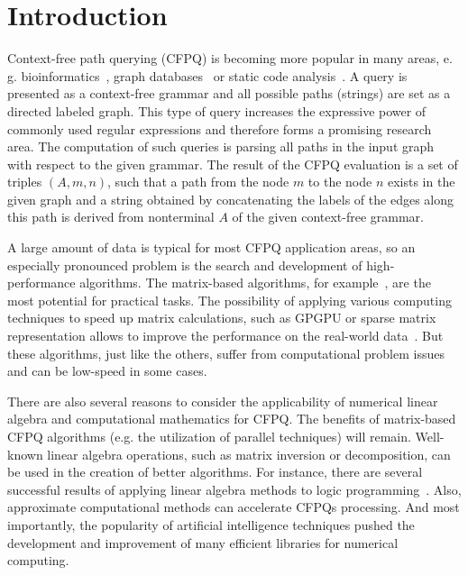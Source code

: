 \documentclass[sigconf]{acmart}
\begin{document}



\maketitle

\section{Introduction}

Context-free path querying (CFPQ) is becoming more popular in many areas, e. g. bioinformatics~\cite{Bio}, graph databases~\cite{graphDB} or static code analysis~\cite{zhang2013fast}. 
A query is presented as a context-free grammar and all possible paths (strings) are set as a directed labeled graph. 
This type of query increases the expressive power of commonly used regular expressions and therefore forms a promising research area.
The computation of such queries is parsing all paths in the input graph with respect to the given grammar. 
The result of the CFPQ evaluation is a set of triples $(A, m, n)$, such that a path from the node $m$ to the node $n$ exists in the given graph and a string obtained by concatenating the labels of the edges along this path is derived from nonterminal $A$ of the given context-free grammar.

A large amount of data is typical for most CFPQ application areas, so an especially pronounced problem is the search and development of high-performance algorithms.
The matrix-based algorithms, for example~\cite{azimov2018context}, are the most potential for practical tasks.
The possibility of applying various computing techniques to speed up matrix calculations, such as GPGPU or sparse matrix representation allows to improve the performance on the real-world data~\cite{mishin2019evaluation}.
But these algorithms, just like the others, suffer from computational problem issues and can be low-speed in some cases.

There are also several reasons to consider the applicability of numerical linear algebra and computational mathematics for CFPQ.
The benefits of matrix-based CFPQ algorithms (e.g. the utilization of parallel techniques) will remain.
Well-known linear algebra operations, such as matrix inversion or decomposition, can be used in the creation of better algorithms. 
For instance, there are several successful results of applying linear algebra methods to logic programming~\cite{sato2017linear, aspis2018linear}. 
Also, approximate computational methods can accelerate CFPQs processing.
And most importantly, the popularity of artificial intelligence techniques pushed the development and improvement of many efficient libraries for numerical computing.
\end{document}
